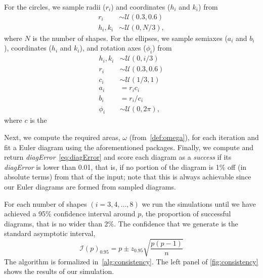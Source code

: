 \documentclass[
  oneside,
  openany,
  numbers=noendperiod,
  parskip=half,
  bibliography=totoc
]{scrbook}\usepackage[]{graphicx}\usepackage{xcolor}
\begin{document}
For the circles, we sample radii ($r_i$) and coordinates ($h_i$ and $k_i$) from
%
\begin{equation}
\begin{aligned}
r_i     & \sim \mathcal{U}(0.3, 0.6)\\
h_i,k_i & \sim \mathcal{U}(0, N/3),
\end{aligned}
\label{eq:consistencyCircles}
\end{equation}
where $N$ is the number of shapes.
For the ellipses, we sample semiaxes ($a_i$ and $b_i$), coordinates
($h_i$ and $k_i$), and rotation axes ($\phi_i$) from
%
\begin{equation}
\begin{aligned}
h_i,k_i & \sim \mathcal{U}(0, i/3)\\
r_i     & \sim \mathcal{U}(0.3, 0.6)\\
c_i     & \sim \mathcal{U}(1/3, 1)\\
a_i     & = r_ic_i\\
b_i     & = r_i/c_i\\
\phi_i  & \sim \mathcal{U}(0, 2\pi),
\end{aligned}
\label{eq:consistencyEllipses}
\end{equation}
where $c$ is the

Next, we compute the required areas, $\omega$ (from~\cref{def:omega}), for each
iteration and fit a Euler diagram using the aforementioned packages. Finally,
we compute and return \emph{diagError}~\eqref{eq:diagError} and score each
diagram as a \emph{success} if its \emph{diagError} is lower than 0.01, that is,
if no portion of the diagram is 1\% off (in absolute terms) from that of the
input; note that this is always achievable since our Euler diagrams are formed
from sampled diagrams.

For each number of shapes $(i=3,4,\dots,8)$ we run the simulations until we have achieved a 95\% confidence interval around $p$, the proportion of successful diagrams, that is no wider than 2\%. The confidence that we generate is the standard asymptotic interval,
\begin{equation*}
\mathcal{I}(p)_{0.95} = p \pm z_{0.95}\sqrt{\frac{p(p-1)}{n}}
\end{equation*}
The algorithm is formalized in~\autoref{alg:consistency}. The left panel of
\cref{fig:consistency} shows the results of our simulation.
\end{document}
